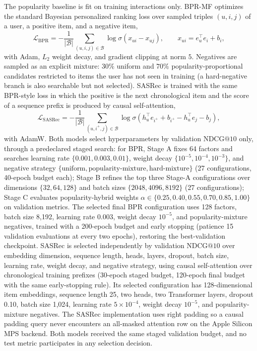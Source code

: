 \documentclass[pdflatex,sn-mathphys-num]{sn-jnl}
\makeatletter
\theoremstyle{thmstyleone}
\theoremstyle{thmstyletwo}
\theoremstyle{thmstylethree}
\newcommand{\NDCG}{\mathrm{NDCG@10}}
\makeatother
\begin{document}
The popularity baseline is fit on training interactions only. BPR-MF optimizes the standard Bayesian personalized ranking loss over sampled triples $(u,i,j)$ of a user, a positive item, and a negative item,
\begin{equation}
 \mathcal{L}_{\mathrm{BPR}}=-\frac{1}{|\mathcal{B}|}\sum_{(u,i,j)\in\mathcal{B}}\log\sigma\!\left(x_{ui}-x_{uj}\right),\qquad x_{ui}=e_u^\top e_i+b_i,
\label{eq:bpr-loss}
\end{equation}
with Adam, $L_2$ weight decay, and gradient clipping at norm $5$. Negatives are sampled as an explicit mixture: $30\%$ uniform and $70\%$ popularity-proportional candidates restricted to items the user has not seen in training (a hard-negative branch is also searchable but not selected). SASRec is trained with the same BPR-style loss in which the positive is the next chronological item and the score of a sequence prefix is produced by causal self-attention,
\begin{equation}
 \mathcal{L}_{\mathrm{SASRec}}=-\frac{1}{|\mathcal{B}|}\sum_{(u,i^+,j)\in\mathcal{B}}\log\sigma\!\left(h_u^\top e_{i^+}+b_{i^+}-h_u^\top e_j-b_j\right),
\label{eq:sasrec-loss}
\end{equation}
with AdamW. Both models select hyperparameters by validation $\NDCG$ only, through a predeclared staged search: for BPR, Stage A fixes 64 factors and searches learning rate $\{0.001,0.003,0.01\}$, weight decay $\{10^{-5},10^{-4},10^{-3}\}$, and negative strategy $\{\text{uniform},\text{popularity-mixture},\text{hard-mixture}\}$ (27 configurations, 40-epoch budget each); Stage B refines the top three Stage-A configurations over dimensions $\{32,64,128\}$ and batch sizes $\{2048,4096,8192\}$ (27 configurations); Stage C evaluates popularity-hybrid weights $\alpha\in\{0.25,0.40,0.55,0.70,0.85,1.00\}$ on validation metrics. The selected final BPR configuration uses 128 factors, batch size 8,192, learning rate $0.003$, weight decay $10^{-5}$, and popularity-mixture negatives, trained with a 200-epoch budget and early stopping (patience 15 validation evaluations at every two epochs), restoring the best-validation checkpoint. SASRec is selected independently by validation $\NDCG$ over embedding dimension, sequence length, heads, layers, dropout, batch size, learning rate, weight decay, and negative strategy, using causal self-attention over chronological training prefixes (30-epoch staged budget, 120-epoch final budget with the same early-stopping rule). Its selected configuration has 128-dimensional item embeddings, sequence length 25, two heads, two Transformer layers, dropout 0.10, batch size 1,024, learning rate $5\times10^{-4}$, weight decay $10^{-5}$, and popularity-mixture negatives. The SASRec implementation uses right padding so a causal padding query never encounters an all-masked attention row on the Apple Silicon MPS backend. Both models received the same staged validation budget, and no test metric participates in any selection decision.
\end{document}

